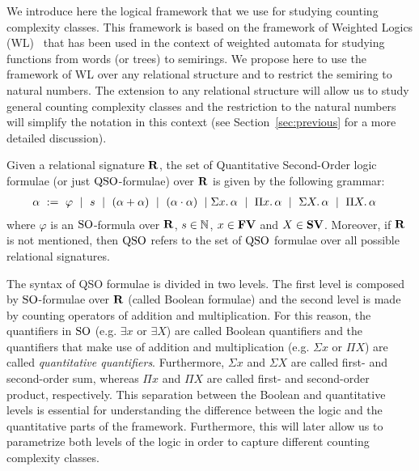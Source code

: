 
We introduce here the logical framework that we use for studying counting complexity classes. 
This framework is based on the framework of Weighted Logics (WL)~\cite{DrosteG07}  that has been used in the context of weighted automata for studying functions from words (or trees) to semirings. 
We propose here to use the framework of WL over any relational structure and to restrict the semiring to natural numbers. 
The extension to any relational structure will allow us to study general counting complexity classes and the restriction to the natural numbers will simplify the notation in this context (see Section~\ref{sec:previous} for a more detailed discussion).

Given a relational signature $\mathbf{R}$, the set of Quantitative Second-Order logic formulae (or just ${\rm QSO}$-formulae) over $\mathbf{R}$ is given by the following grammar:
\begin{align}
\alpha \ &:= \ \varphi \ \mid \ s \ \mid \ (\alpha \add \alpha) \ \mid\ (\alpha \mult \alpha) \ \mid \sa{x} \alpha \ \mid \ \pa{x} \alpha \ \mid \ \sa{X} \alpha \ \mid \ \pa{X} \alpha \label{syntax} 
\end{align}
where $\varphi$ is an ${\rm SO}$-formula over $\mathbf{R}$, $s \in \mathbb{N}$, $x \in \mathbf{FV}$ and $X \in \mathbf{SV}$. Moreover, if $\mathbf{R}$ is not mentioned, then ${\rm QSO}$ refers to the set of ${\rm QSO}$ formulae over all possible relational signatures.

The syntax of QSO formulae is divided in two levels. 
The first level is composed by ${\rm SO}$-formulae over $\mathbf{R}$ (called Boolean formulae) and the second level is made by counting operators of addition and multiplication. 
For this reason, the quantifiers in ${\rm SO}$ (e.g. $\exists x$ or $\exists X$) are called Boolean quantifiers and the quantifiers that make use of addition and multiplication (e.g. $\Sigma x$ or $\Pi X$) are called {\em quantitative quantifiers}.
Furthermore, $\Sigma x$ and $\Sigma X$ are called first- and second-order sum, whereas $\Pi x$ and $\Pi X$ are called first- and second-order product, respectively.
This separation between the Boolean and quantitative levels is essential for understanding the difference between the logic and the quantitative parts of the framework.
Furthermore, this will later allow us to parametrize both levels of the logic in order to capture different counting complexity classes.

